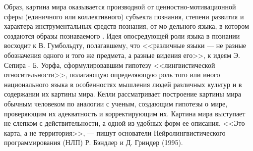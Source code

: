 \documentclass[12pt]{report}
\begin{document}
	Образ, картина мира оказывается производной от ценностно-мотивационной сферы (единичного или коллективного) субъекта познания, степени развития и характера инструментальных средств познания, от мо-дельного языка, в котором создаются образы познаваемого \cite{Petrenko2009}. Идея опосредующей роли языка в познании восходит к В. Гумбольдту, полагавшему, что <<различные языки --- не разные обозначения одного и того же предмета, а разные видения его>>, к идеям Э. Сепира - Б. Уорфа, сформулировавшим гипотезу <<лингвистической относительности>>, полагающую определяющую роль того или иного национального языка в особенностях мышления людей различных культур и в содержании их картины мира. Келли рассматривает построение картины мира обычным человеком по аналогии с ученым, создающим гипотезы о мире, проверяющим их адекватность и корректирующим их. 
	Картина мира выступает не слепком с действительности, а одной из удобных форм ее описания. <<Это карта, а не территория>>, --- пишут основатели Нейролингвистического программирования (НЛП) Р. Бэндлер	и Д. Гриндер (1995).


	\printbibliography[keyword={psycho},resetnumbers=true]
	
\end{document}
